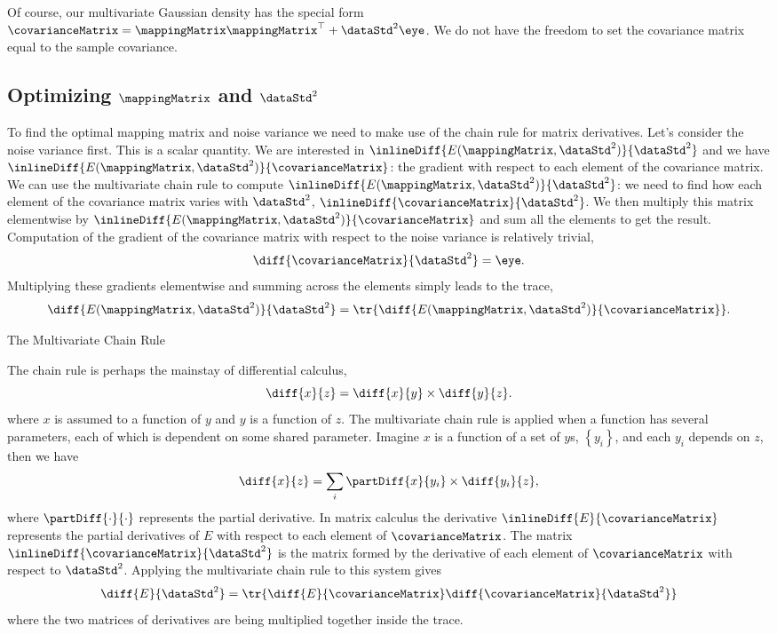 Of course, our multivariate Gaussian density has the special form
$\covarianceMatrix = \mappingMatrix \mappingMatrix^\top + \dataStd^2
\eye$. We do not have the freedom to set the covariance matrix equal
to the sample covariance.

\subsection{Optimizing $\mappingMatrix$ and $\dataStd^2$}

To find the optimal mapping matrix and noise variance we need to make
use of the chain rule for matrix derivatives. Let's consider the noise
variance first. This is a scalar quantity. We are interested in
$\inlineDiff{E(\mappingMatrix, \dataStd^2)}{\dataStd^2}$ and we have
$\inlineDiff{E(\mappingMatrix, \dataStd^2)}{\covarianceMatrix}$: the
gradient with respect to each element of the covariance matrix. We can
use the multivariate chain rule to compute
$\inlineDiff{E(\mappingMatrix, \dataStd^2)}{\dataStd^2}$: we need to
find how each element of the covariance matrix varies with
$\dataStd^2$, $\inlineDiff{\covarianceMatrix}{\dataStd^2}$. We then
multiply this matrix elementwise by $\inlineDiff{E(\mappingMatrix,
  \dataStd^2)}{\covarianceMatrix}$ and sum all the elements to get the
result. Computation of the gradient of the covariance matrix with
respect to the noise variance is relatively trivial,
\[
\diff{\covarianceMatrix}{\dataStd^2} = \eye.
\]
Multiplying these gradients elementwise and summing across the
elements simply leads to the trace,
\[
\diff{E(\mappingMatrix, \dataStd^2)}{\dataStd^2} = \tr{\diff{E(\mappingMatrix, \dataStd^2)}{\covarianceMatrix}}.
\]
\begin{boxfloat}
  \caption{The Multivariate Chain Rule}\label{box:mvchainRule}

  \boxfontsize The chain rule is perhaps the mainstay of differential calculus,
  \[
  \diff{x}{z} = \diff{x}{y} \times \diff{y}{z}.
  \]
  where $x$ is assumed to a function of $y$ and $y$ is a function of
  $z$. The multivariate chain rule is applied when a function has
  several parameters, each of which is dependent on some shared
  parameter. Imagine $x$ is a function of a set of $y$s,
  $\left\{y_i\right\}$, and each $y_i$ depends on $z$, then we have
  \[
  \diff{x}{z} = \sum_{i}\partDiff{x}{y_i} \times \diff{y_i}{z},
  \]
  where $\partDiff{\cdot}{\cdot}$ represents the partial derivative.
  In matrix calculus the derivative
  $\inlineDiff{E}{\covarianceMatrix}$ represents the partial
  derivatives of $E$ with respect to each element of
  $\covarianceMatrix$. The matrix
  $\inlineDiff{\covarianceMatrix}{\dataStd^2}$ is the matrix formed by
  the derivative of each element of $\covarianceMatrix$ with respect
  to $\dataStd^2$. Applying the multivariate chain rule to this system
  gives
  \[
  \diff{E}{\dataStd^2} = \tr{\diff{E}{\covarianceMatrix} \diff{\covarianceMatrix}{\dataStd^2}}
  \]
  where the two matrices of derivatives are being multiplied together
  inside the trace.
\end{boxfloat}

